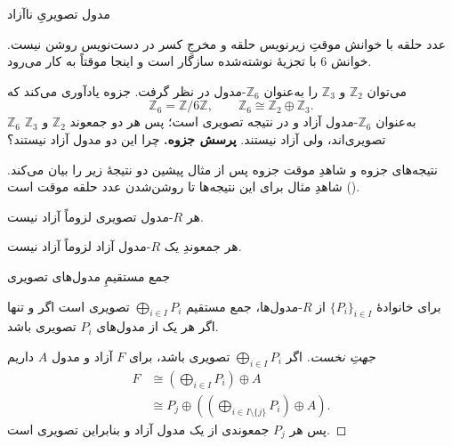\begin{frame}[t]{مدول تصویریِ ناآزاد}
\label{lec17:z6-projective-nonfree}
\begin{alertblock}{عدد حلقه با خوانش موقتِ }
زیرنویس حلقه و مخرجِ کسر در دست‌نویس روشن نیست.
خوانش $6$ با تجزیهٔ نوشته‌شده سازگار است و اینجا موقتاً به کار می‌رود.
\end{alertblock}
می‌توان $\mathbb Z_2$ و $\mathbb Z_3$ را به‌عنوان
$\mathbb Z_6$-مدول در نظر گرفت. جزوه یادآوری می‌کند که
\[
\mathbb Z_6=\mathbb Z/6\mathbb Z,\qquad
\mathbb Z_6\cong\mathbb Z_2\oplus\mathbb Z_3.
\]
$\mathbb Z_6$ به‌عنوان $\mathbb Z_6$-مدول آزاد و در نتیجه تصویری است؛
پس هر دو جمعوند $\mathbb Z_2$ و $\mathbb Z_3$ تصویری‌اند، ولی آزاد نیستند.
\textbf{پرسش جزوه.} چرا این دو مدول آزاد نیستند؟
\end{frame}

\begin{frame}[t]{نتیجه‌های جزوه و شاهدِ موقت}
\label{lec17:nonfree-consequences}
جزوه پس از مثال پیشین دو نتیجهٔ زیر را بیان می‌کند.
شاهدِ مثال برای این نتیجه‌ها تا روشن‌شدن عدد حلقه موقت است ().
\begin{corollary}
هر $R$-مدول تصویری لزوماً آزاد نیست.
\end{corollary}
\begin{corollary}
هر جمعوندِ یک $R$-مدول آزاد لزوماً آزاد نیست.
\end{corollary}
\end{frame}

\begin{frame}[t]{جمع مستقیمِ مدول‌های تصویری}
\label{lec17:projective-direct-sum}
\begin{theorem}
برای خانوادهٔ $\{P_i\}_{i\in I}$ از $R$-مدول‌ها، جمع مستقیم
$\bigoplus_{i\in I}P_i$ تصویری است اگر و تنها اگر هر یک از مدول‌های
$P_i$ تصویری باشد.
\end{theorem}
\begin{proof}[جهتِ نخست]
اگر $\bigoplus_{i\in I}P_i$ تصویری باشد، برای $F$ آزاد و مدول $A$ داریم
\[
\begin{aligned}
F&\cong\left(\bigoplus_{i\in I}P_i\right)\oplus A\\
&\cong P_j\oplus\left(\left(\bigoplus_{i\in I\setminus\{j\}}P_i\right)\oplus A\right).
\end{aligned}
\]
پس هر $P_j$ جمعوندی از یک مدول آزاد و بنابراین تصویری است.
\end{proof}
\end{frame}

